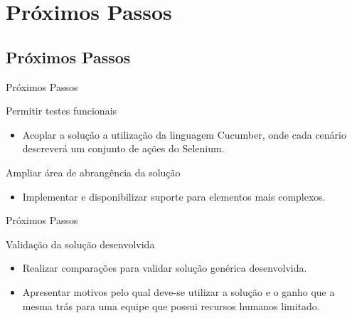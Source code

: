 \documentclass{beamer}
\begin{document}
\section{Próximos Passos}
\subsection{Próximos Passos}
\begin{frame}{Próximos Passos}
    \item Permitir testes funcionais
	\begin{itemize}
		\item Acoplar a solução a utilização da linguagem Cucumber, onde cada cenário descreverá um conjunto de ações do Selenium.
	\end{itemize}
    \item Ampliar área de abrangência da solução
	\begin{itemize}
		\item Implementar e disponibilizar suporte para elementos mais complexos.
	\end{itemize}
\end{frame}
\begin{frame}{Próximos Passos}
    \item Validação da solução desenvolvida
	\begin{itemize}
		\item Realizar comparações para validar solução genérica desenvolvida.
		\item Apresentar motivos pelo qual deve-se utilizar a solução e o ganho que a mesma trás para uma equipe que possui recursos humanos limitado.
	\end{itemize}
\end{frame}


\begin{frame}
\titlepage
\end{frame}
\end{document}

